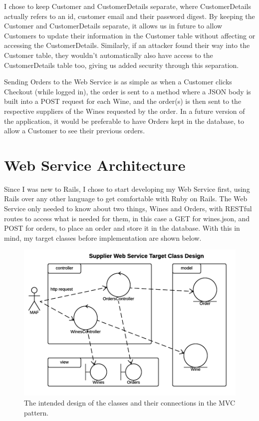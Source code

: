 \documentclass[12pt]{article}
\begin{document}
I chose to keep Customer and CustomerDetails separate, where CustomerDetails actually refers to an id, customer email and their password digest. By keeping the Customer and CustomerDetails separate, it allows us in future to allow Customers to update their information in the Customer table without affecting or accessing the CustomerDetails. Similarly, if an attacker found their way into the Customer table, they wouldn't automatically also have access to the CustomerDetails table too, giving us added security through this separation.

Sending Orders to the Web Service is as simple as when a Customer clicks Checkout (while logged in), the order is sent to a method where a JSON body is built into a POST request for each Wine, and the order(s) is then sent to the respective suppliers of the Wines requested by the order. In a future version of the application, it would be preferable to have Orders kept in the database, to allow a Customer to see their previous orders.


\section{Web Service Architecture}

Since I was new to Rails, I chose to start developing my Web Service first, using Rails over any other language to get comfortable with Ruby on Rails. The Web Service only needed to know about two things, Wines and Orders, with RESTful routes to access what is needed for them, in this case a GET for wines.json, and POST for orders, to place an order and store it in the database. With this in mind, my target classes before implementation are shown below.

\begin{figure}[H]
        \centering
                \includegraphics[width=1\textwidth]{assets/Supplier_Web_Service_Target_Class_Design}
                \caption{The intended design of the classes and their connections in the MVC pattern.}
                \label{fig: Target Class Diagram.} 
\end{figure}
\end{document}
